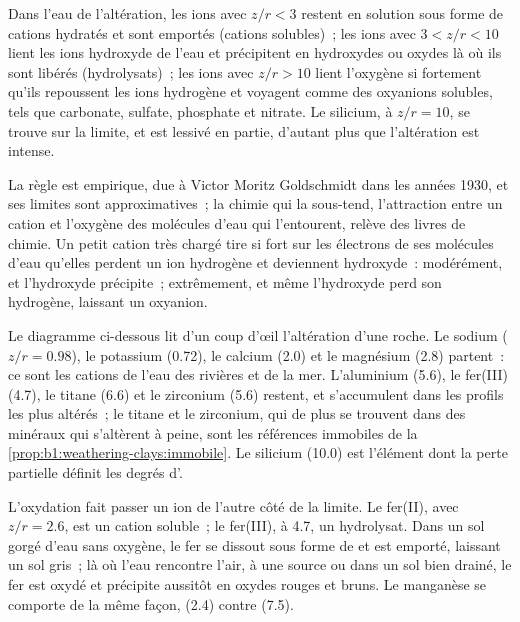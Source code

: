 \begin{proposition}\label{prop:b1:weathering-clays:fields}
Dans l'eau de l'altération, les ions avec $z/r < 3$ restent en solution sous forme de
cations hydratés et sont emportés (cations solubles)~; les ions avec $3 < z/r < 10$ lient
les ions hydroxyde de l'eau et précipitent en hydroxydes ou oxydes là où ils
sont libérés (hydrolysats)~; les ions avec $z/r > 10$ lient l'oxygène si fortement
qu'ils repoussent les ions hydrogène et voyagent comme des oxyanions solubles, tels que
carbonate, sulfate, phosphate et nitrate. Le silicium, à $z/r = 10$, se trouve sur la
limite, et est lessivé en partie, d'autant plus que l'altération est intense.
\end{proposition}
\admitted

La règle est empirique, due à Victor Moritz Goldschmidt dans les années 1930, et ses
limites sont approximatives~; la chimie qui la sous-tend, l'attraction entre un
cation et l'oxygène des molécules d'eau qui l'entourent, relève des
livres de chimie. Un petit cation très chargé tire si fort sur les électrons de ses
molécules d'eau qu'elles perdent un ion hydrogène et deviennent hydroxyde~:
modérément, et l'hydroxyde précipite~; extrêmement, et même l'hydroxyde
perd son hydrogène, laissant un oxyanion.

Le diagramme ci-dessous lit d'un coup d'œil l'altération d'une roche. Le sodium ($z/r = 0.98$),
le potassium (0.72), le calcium (2.0) et le magnésium (2.8) partent~: ce sont les
cations de l'eau des rivières et de la mer. L'aluminium (5.6), le fer(III) (4.7), le titane
(6.6) et le zirconium (5.6) restent, et s'accumulent dans les profils les plus altérés~;
le titane et le zirconium, qui de plus se trouvent dans des minéraux qui s'altèrent à peine,
sont les références immobiles de la \cref{prop:b1:weathering-clays:immobile}. Le silicium
(10.0) est l'élément dont la perte partielle définit les degrés d'.

L'oxydation fait passer un ion de l'autre côté de la limite. Le fer(II), avec $z/r = 2.6$, est un
cation soluble~; le fer(III), à 4.7, un hydrolysat. Dans un sol gorgé d'eau
sans oxygène, le fer se dissout sous forme de  et est emporté, laissant un sol
gris~; là où l'eau rencontre l'air, à une source ou dans un sol bien drainé, le
fer est oxydé et précipite aussitôt en oxydes rouges et bruns. Le manganèse
se comporte de la même façon,  (2.4) contre  (7.5).

